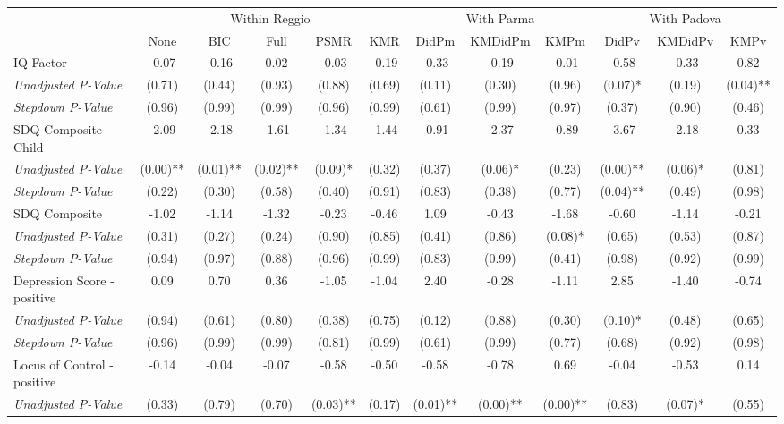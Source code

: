 \begin{tabular}{l c c c c c c c c c c c}
\toprule
& \multicolumn{5}{c}{Within Reggio} & \multicolumn{3}{c}{With Parma} & \multicolumn{3}{c}{With Padova} \\\cmidrule(lr){2-6} \cmidrule(lr){7-9} \cmidrule(lr){10-12}
 & None & BIC & Full & PSMR & KMR & DidPm & KMDidPm & KMPm & DidPv & KMDidPv & KMPv \\
\midrule
IQ Factor & -0.07 & -0.16 & 0.02 & -0.03 & -0.19 & -0.33 & -0.19 & -0.01 & -0.58 & -0.33 & 0.82 \\
\quad \textit{Unadjusted P-Value} & (0.71) & (0.44) & (0.93) & (0.88) & (0.69) & (0.11) & (0.30) & (0.96) & (0.07)* & (0.19) & (0.04)** \\
\quad \textit{Stepdown P-Value} & (0.96) & (0.99) & (0.99) & (0.96) & (0.99) & (0.61) & (0.99) & (0.97) & (0.37) & (0.90) & (0.46) \\
SDQ Composite - Child & -2.09 & -2.18 & -1.61 & -1.34 & -1.44 & -0.91 & -2.37 & -0.89 & -3.67 & -2.18 & 0.33 \\
\quad \textit{Unadjusted P-Value} & (0.00)** & (0.01)** & (0.02)** & (0.09)* & (0.32) & (0.37) & (0.06)* & (0.23) & (0.00)** & (0.06)* & (0.81) \\
\quad \textit{Stepdown P-Value} & (0.22) & (0.30) & (0.58) & (0.40) & (0.91) & (0.83) & (0.38) & (0.77) & (0.04)** & (0.49) & (0.98) \\
SDQ Composite & -1.02 & -1.14 & -1.32 & -0.23 & -0.46 & 1.09 & -0.43 & -1.68 & -0.60 & -1.14 & -0.21 \\
\quad \textit{Unadjusted P-Value} & (0.31) & (0.27) & (0.24) & (0.90) & (0.85) & (0.41) & (0.86) & (0.08)* & (0.65) & (0.53) & (0.87) \\
\quad \textit{Stepdown P-Value} & (0.94) & (0.97) & (0.88) & (0.96) & (0.99) & (0.83) & (0.99) & (0.41) & (0.98) & (0.92) & (0.99) \\
Depression Score - positive & 0.09 & 0.70 & 0.36 & -1.05 & -1.04 & 2.40 & -0.28 & -1.11 & 2.85 & -1.40 & -0.74 \\
\quad \textit{Unadjusted P-Value} & (0.94) & (0.61) & (0.80) & (0.38) & (0.75) & (0.12) & (0.88) & (0.30) & (0.10)* & (0.48) & (0.65) \\
\quad \textit{Stepdown P-Value} & (0.96) & (0.99) & (0.99) & (0.81) & (0.99) & (0.61) & (0.99) & (0.77) & (0.68) & (0.92) & (0.98) \\
Locus of Control - positive & -0.14 & -0.04 & -0.07 & -0.58 & -0.50 & -0.58 & -0.78 & 0.69 & -0.04 & -0.53 & 0.14 \\
\quad \textit{Unadjusted P-Value} & (0.33) & (0.79) & (0.70) & (0.03)** & (0.17) & (0.01)** & (0.00)** & (0.00)** & (0.83) & (0.07)* & (0.55) \\

\end{tabular}

